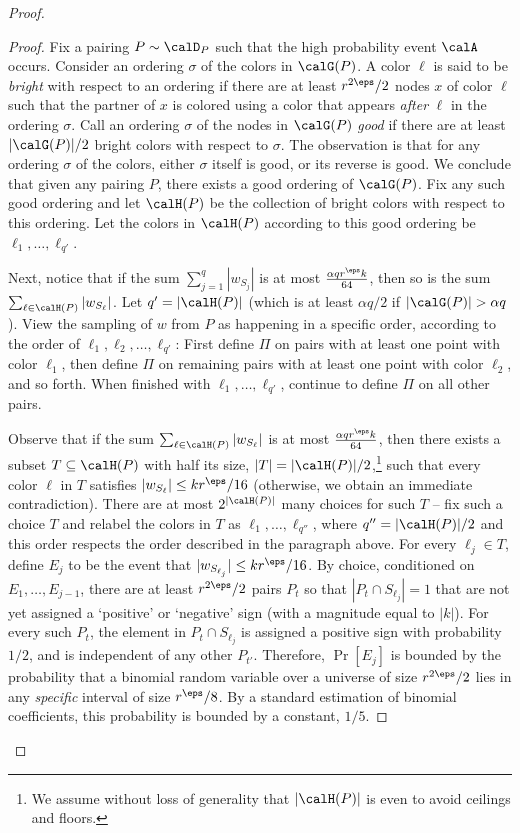 \documentclass{article}
\begin{document}
\begin{proof}
\begin{proof}
Fix a pairing $P\sim \calD_P$ such that the high probability event $\calA$ occurs. Consider an ordering $\sigma$ of the colors in $\calG(P)$. A color $\ell$ is said to be \emph{bright} with respect to an ordering if there are at least $r^{2\eps}/2$ nodes $x$ of color $\ell$ such that the partner of $x$ is colored using a color that appears \emph{after} $\ell$ in the ordering $\sigma$.  Call an ordering $\sigma$ of the nodes in $\calG(P)$ \emph{good} if there are at least $|\calG(P)|/2$ bright colors  with respect to $\sigma$. The observation is that for any ordering $\sigma$ of the colors, either $\sigma$ itself is good, or its reverse is good. We conclude that given any pairing $P$, there exists a good ordering of $\calG(P)$. Fix any such good ordering and let $\calH(P)$ be the collection of bright colors with respect to this ordering. Let the colors in $\calH(P)$ according to this good ordering be $\ell_1,\ldots, \ell_{q'}$.

Next, notice that if the sum $\sum_{j=1}^{q}|w_{S_j}|$ is at most $\frac{\alpha qr^\eps k}{64}$, then so is the sum $\sum_{\ell\in \calH(P)}|w_{S_\ell}|$. Let $q' = |\calH(P)|$ (which is at least $\alpha q/2$ if $|\calG(P)|>\alpha q$). View the sampling of $w$ from $P$ as happening in a specific order, according to the order
of $\ell_1, \ell_2, \ldots, \ell_{q'}$: First define $\Pi$ on pairs with at least one point with color $\ell_1$, then define $\Pi$ on
remaining pairs with at least one point with color $\ell_2$, and so forth. When finished with $\ell_1,\ldots, \ell_{q'}$,
continue to define $\Pi$ on all other pairs.

Observe that if the sum $\sum_{\ell\in \calH(P)}|w_{S_\ell}|$ is at most $\frac{\alpha qr^\eps k}{64}$, then there exists a subset $T\subseteq \calH(P)$ with half its size, $|T|= |\calH(P)|/2$,\footnote{We assume without loss of generality that $|\calH(P)|$ is even to avoid ceilings and floors.} such that every color $\ell$ in $T$ satisfies $|w_{S_\ell}|\leq kr^\eps /16$ (otherwise, we obtain an immediate contradiction). There are at most $2^{|\calH(P)|}$ many choices for such $T$ -- fix such a choice $T$ and relabel the colors in $T$ as $\ell_1,\ldots, \ell_{q''}$, where $q'' = |\calH(P)|/2$ and this order respects the order described in the paragraph above.
For every $\ell_j\in T$, define $E_j$ to be the event that $|w_{S_{\ell_j}}|\leq kr^\eps /16$. 
By choice, conditioned on $E_1,\ldots, E_{j-1}$, there are at least $r^{2\eps}/2$ pairs $P_t$ so that
$|P_t \cap S_{\ell_j}| = 1$ that are not yet assigned a `positive' or `negative' sign (with a magnitude equal to $|k|$). For every such $P_t$, the element in $P_t \cap S_{\ell_j}$
is assigned a positive sign with probability $1/2$, and is independent of any other $P_{t'}$. Therefore, $\Pr[E_j]$ is bounded by the probability that a binomial random variable over a universe of size $r^{2\eps}/2$ lies in any \emph{specific} interval of size $r^\eps/8$. By a standard estimation of binomial coefficients, this probability is bounded by a constant, $1/5$.


\end{proof}
\end{proof}
\end{document}
